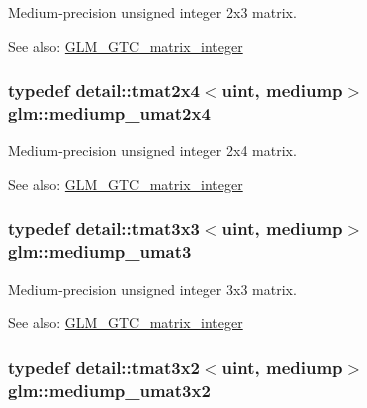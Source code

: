 Medium-precision unsigned integer 2x3 matrix. \begin{Desc}
\item[See also:]\hyperlink{group__gtc__matrix__integer}{GLM\_\-GTC\_\-matrix\_\-integer} \end{Desc}
\hypertarget{group__gtc__matrix__integer_gf79e9c80f024d31f3d66ddae75e90b6c}{
\subsubsection[mediump\_\-umat2x4]{\setlength{\rightskip}{0pt plus 5cm}typedef detail::tmat2x4$<$uint, mediump$>$ {\bf glm::mediump\_\-umat2x4}}}
\label{group__gtc__matrix__integer_gf79e9c80f024d31f3d66ddae75e90b6c}


Medium-precision unsigned integer 2x4 matrix. \begin{Desc}
\item[See also:]\hyperlink{group__gtc__matrix__integer}{GLM\_\-GTC\_\-matrix\_\-integer} \end{Desc}
\hypertarget{group__gtc__matrix__integer_g123f7d8bac8849e3a150bdf8a21e44a2}{
\subsubsection[mediump\_\-umat3]{\setlength{\rightskip}{0pt plus 5cm}typedef detail::tmat3x3$<$uint, mediump$>$ {\bf glm::mediump\_\-umat3}}}
\label{group__gtc__matrix__integer_g123f7d8bac8849e3a150bdf8a21e44a2}


Medium-precision unsigned integer 3x3 matrix. \begin{Desc}
\item[See also:]\hyperlink{group__gtc__matrix__integer}{GLM\_\-GTC\_\-matrix\_\-integer} \end{Desc}
\hypertarget{group__gtc__matrix__integer_g65a9fdb1a5918fe6f308577065983e23}{
\subsubsection[mediump\_\-umat3x2]{\setlength{\rightskip}{0pt plus 5cm}typedef detail::tmat3x2$<$uint, mediump$>$ {\bf glm::mediump\_\-umat3x2}}}
\label{group__gtc__matrix__integer_g65a9fdb1a5918fe6f308577065983e23}


